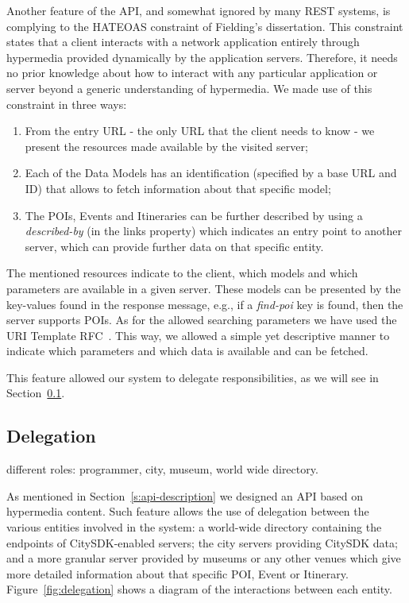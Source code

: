 \documentclass[times]{ettauth}
\begin{document}
Another feature of the API, and somewhat ignored by many REST systems, is complying to the \acf{HATEOAS} constraint of Fielding's dissertation. This constraint states that a client interacts with a network application entirely through hypermedia provided dynamically by the application servers. Therefore, it needs no prior knowledge about how to interact with any particular application or server beyond a generic understanding of hypermedia. We made use of this constraint in three ways:
\begin{enumerate}
\item From the entry URL - the only URL that the client needs to know - we present the resources made available by the visited server;
\item Each of the Data Models has an identification (specified by a base URL and ID) that allows to fetch information about that specific model;
\item The POIs, Events and Itineraries can be further described by using a \textit{described-by} (in the links property) which indicates an entry point to another server, which can provide further data on that specific entity.
\end{enumerate}

The mentioned resources indicate to the client, which models and which parameters are available in a given server. These models can be presented by the key-values found in the response message, e.g., if a \textit{find-poi} key is found, then the server supports \acp{POI}. As for the allowed searching parameters we have used the URI Template RFC~\cite{uri-template}. This way, we allowed a simple yet descriptive manner to indicate which parameters and which data is available and can be fetched.

This feature allowed our system to delegate responsibilities, as we will see in Section~\ref{delegation}.

\subsection{Delegation}
\label{delegation}

different roles: programmer, city, museum, world wide directory.


As mentioned in Section~\ref{s:api-description} we designed an API based on hypermedia content. Such feature allows the use of delegation between the various entities involved in the system: a world-wide directory containing the endpoints of CitySDK-enabled servers; the city servers providing CitySDK data; and a more granular server provided by museums or any other venues which give more detailed information about that specific \ac{POI}, Event or Itinerary. Figure~\ref{fig:delegation} shows a diagram of the interactions between each entity.
\end{document}
